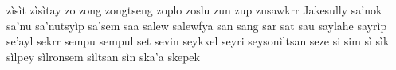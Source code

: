 \documentclass[a4paper]{article}
\begin{document}
zìsìt\hspace{2mm}
zìsìtay\hspace{2mm}
zo\hspace{2mm}
zong\hspace{2mm}
zongtseng\hspace{2mm}
zoplo\hspace{2mm}
zoslu\hspace{2mm}
zun\hspace{2mm}
zup\hspace{2mm}
zusawkrr\hspace{2mm}
Jakesully\hspace{2mm}
sa'nok\hspace{2mm}
sa'nu\hspace{2mm}
sa'nutsyìp\hspace{2mm}
sa'sem\hspace{2mm}
saa\hspace{2mm}
salew\hspace{2mm}
salewfya\hspace{2mm}
san\hspace{2mm}
sang\hspace{2mm}
sar\hspace{2mm}
sat\hspace{2mm}
sau\hspace{2mm}
saylahe\hspace{2mm}
sayrìp\hspace{2mm}
se'ayl\hspace{2mm}
sekrr\hspace{2mm}
sempu\hspace{2mm}
sempul\hspace{2mm}
set\hspace{2mm}
sevin\hspace{2mm}
seykxel\hspace{2mm}
seyri\hspace{2mm}
seysonìltsan\hspace{2mm}
seze\hspace{2mm}
si\hspace{2mm}
sim\hspace{2mm}
sì\hspace{2mm}
sìk\hspace{2mm}
sìlpey\hspace{2mm}
sìlronsem\hspace{2mm}
sìltsan\hspace{2mm}
sìn\hspace{2mm}
ska'a\hspace{2mm}
skepek\hspace{2mm}
\end{document}
